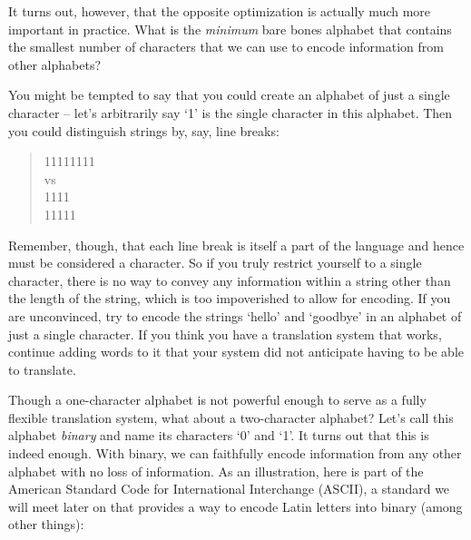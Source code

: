 \documentclass[UTF8]{book}
\begin{document}
\begin{CJK}{UTF8}{gbsn}
It turns out, however, that the opposite optimization is actually much more important in practice. What is the \emph{minimum} bare bones alphabet that contains the smallest number of characters that we can use to encode information from other alphabets?

You might be tempted to say that you could create an alphabet of just a single character -- let's arbitrarily say `1' is the single character in this alphabet. Then you could distinguish strings by, say, line breaks:

\begin{quotation}
\centering

11111111 \\

vs \\

1111 \\
11111

\end{quotation}

Remember, though, that each line break is itself a part of the language and hence must be considered a character. So if you truly restrict yourself to a single character, there is no way to convey any information within a string other than the length of the string, which is too impoverished to allow for encoding. If you are unconvinced, try to encode the strings `hello' and `goodbye' in an alphabet of just a single character. If you think you have a translation system that works, continue adding words to it that your system did not anticipate having to be able to translate.

Though a one-character alphabet is not powerful enough to serve as a fully flexible translation system, what about a two-character alphabet? Let's call this alphabet \emph{binary} and name its characters `0' and `1'. It turns out that this is indeed enough. With binary, we can faithfully encode information from any other alphabet with no loss of information. As an illustration, here is part of the American Standard Code for International Interchange (ASCII), a standard we will meet later on that provides a way to encode Latin letters into binary (among other things):


\end{CJK}
\end{document}
